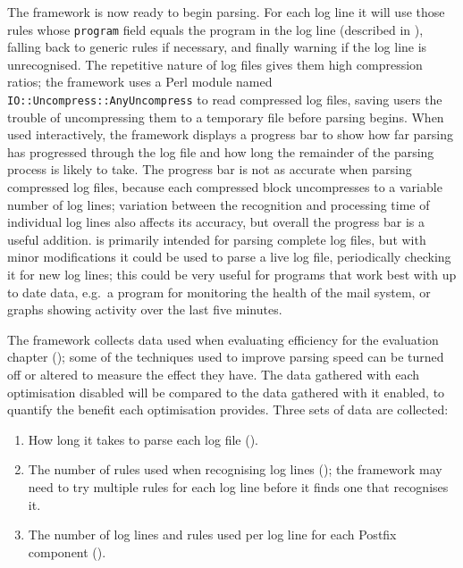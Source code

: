 The framework is now ready to begin parsing.  For each log line it will use
those rules whose \texttt{program} field equals the program in the log line
(described in ), falling back
to generic rules if necessary, and finally warning if the log line is
unrecognised.  The repetitive nature of log files gives them high
compression ratios; the framework uses a Perl module named
\texttt{IO::Uncompress::AnyUncompress} to read compressed log files, saving
users the trouble of uncompressing them to a temporary file before parsing
begins.  When used interactively, the framework displays a progress bar to
show how far parsing has progressed through the log file and how long the
remainder of the parsing process is likely to take.  The progress bar is
not as accurate when parsing compressed log files, because each compressed
block uncompresses to a variable number of log lines; variation between the
recognition and processing time of individual log lines also affects its
accuracy, but overall the progress bar is a useful addition.  \parsername{}
is primarily intended for parsing complete log files, but with minor
modifications it could be used to parse a live log file, periodically
checking it for new log lines; this could be very useful for programs that
work best with up to date data, e.g.\ a program for monitoring the health
of the mail system, or graphs showing activity over the last five minutes.

The framework collects data used when evaluating \parsernames{} efficiency
for the evaluation chapter (); some of the
techniques used to improve parsing speed can be turned off or altered to
measure the effect they have.  The data gathered with each optimisation
disabled will be compared to the data gathered with it enabled, to quantify
the benefit each optimisation provides.  Three sets of data are collected:

\begin{enumerate}

    \item How long it takes to parse each log file ().

    \item The number of rules used when recognising log lines
        (); the framework
        may need to try multiple rules for each log line before it finds
        one that recognises it.

    \item The number of log lines and rules used per log line for each
        Postfix component ().

\end{enumerate}

